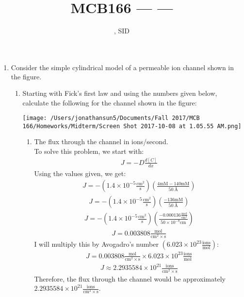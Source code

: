 \documentclass[11pt]{article}
\title{MCB166 --- \Session --- \Homework}
\author{\Name, SID \SID}
\date{\displaydate{date}}
\begin{document}
\maketitle

\newpage
\begin{enumerate}[label=\arabic*.]
\item
Consider the simple cylindrical model of a  permeable ion channel shown in the figure.
\begin{enumerate}[label=\Alph*.]
\item
Starting with Fick’s first law and using the numbers given below, calculate the following for the  channel shown in the figure:
\begin{center}
\texttt{[image: /Users/jonathansun5/Documents/Fall 2017/MCB 166/Homeworks/Midterm/Screen Shot 2017-10-08 at 1.05.55 AM.png]}
\end{center}
\begin{enumerate}[label=\arabic*.]
\item
The flux through the channel in ions/second.
\vspace*{1\baselineskip}
\\
To solve this problem, we start with:
\begin{align*}
J = -D \frac{d[C]} {dx}
\end{align*}
Using the values given, we get:
\begin{align*}
J = -\left(1.4 \times 10^{-5} \frac{\text{cm} ^ 2} {\text{s}}\right) \left(\frac{4 \text{mM} - 140 \text{mM}} {\SI{50}{\angstrom}}\right)
\end{align*}
\begin{align*}
J = -\left(1.4 \times 10^{-5} \frac{\text{cm} ^ 2} {\text{s}}\right) \left(\frac{- 136 \text{mM}} {\SI{50}{\angstrom}}\right)
\end{align*}
\begin{align*}
J = -\left(1.4 \times 10^{-5} \frac{\text{cm} ^ 2} {\text{s}}\right) \left(\frac{- 0.000136 \frac{\text{mol}} {\text{cm} ^ 3}} {50 \times 10 ^ {-8} \text{cm}}\right)
\end{align*}
\begin{align*}
J = 0.003808 \frac{\text{mol}} {\text{cm} ^ {2} \times \text{s}}
\end{align*}
I will multiply this by Avogadro's number $\left(6.023 \times 10 ^{23} \frac{\text{ions}} {\text{mol}}\right)$:
\begin{align*}
J = 0.003808 \frac{\text{mol}} {\text{cm} ^ {2} \times \text{s}} \times 6.023 \times 10 ^{23} \frac{\text{ions}} {\text{mol}}
\end{align*}
\begin{align*}
J \approx 2.2935584 \times 10 ^ {21} \frac{\text{ions}} {\text{cm} ^ {2} \times \text{s}}
\end{align*}
Therefore, the flux through the channel would be approximately $2.2935584 \times 10 ^ {21} \frac{\text{ions}} {\text{cm} ^ {2} \times \text{s}}$.




\end{enumerate}
\end{enumerate}
\end{enumerate}
\end{document}
